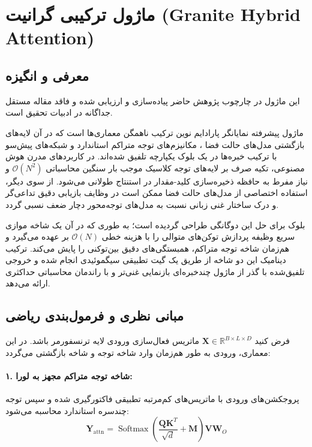 \section{ماژول ترکیبی گرانیت (Granite Hybrid Attention)}
\label{sec:module_granite_hybrid}

\subsection{معرفی و انگیزه}
این ماژول در چارچوب پژوهش حاضر پیاده‌سازی و ارزیابی شده و فاقد مقاله مستقل جداگانه در ادبیات تحقیق است.

ماژول پیشرفته  نمایانگر پارادایم نوین ترکیب ناهمگن معماری‌ها  است که در آن لایه‌های بازگشتی مدل‌های حالت فضا ، مکانیزم‌های توجه متراکم استاندارد  و شبکه‌های پیش‌سو با ترکیب خبره‌ها  در یک بلوک یکپارچه تلفیق شده‌اند. در کاربردهای مدرن هوش مصنوعی، تکیه صرف بر لایه‌های توجه کلاسیک موجب بار سنگین محاسباتی $\mathcal{O}(N^2)$ و نیاز مفرط به حافظه ذخیره‌سازی کلید-مقدار  در استنتاج طولانی می‌شود. از سوی دیگر، استفاده اختصاصی از مدل‌های حالت فضا ممکن است در وظایف بازیابی دقیق تداعی‌گر  و درک ساختار غنی زبانی نسبت به مدل‌های توجه‌محور دچار ضعف نسبی گردد.

بلوک  برای حل این دوگانگی طراحی گردیده است؛ به طوری که در آن یک شاخه موازی سریع  وظیفه پردازش توکن‌های متوالی را با هزینه خطی $\mathcal{O}(N)$ بر عهده می‌گیرد و هم‌زمان شاخه توجه متراکم، همبستگی‌های دقیق بین‌توکنی را پایش می‌کند. ترکیب دینامیک این دو شاخه از طریق یک گیت تطبیقی سیگموئیدی انجام شده و خروجی تلفیق‌شده با گذر از ماژول چندخبره‌ای  بازنمایی غنی‌تر و با راندمان محاسباتی حداکثری ارائه می‌دهد.

\subsection{مبانی نظری و فرمول‌بندی ریاضی}
فرض کنید $\mathbf{X} \in \mathbb{R}^{B \times L \times D}$ ماتریس فعال‌سازی ورودی لایه ترنسفورمر باشد. در این معماری، ورودی به طور هم‌زمان وارد شاخه توجه و شاخه بازگشتی  می‌گردد:

\paragraph{۱. شاخه توجه متراکم مجهز به لورا:}
پروجکشن‌های ورودی با ماتریس‌های کم‌مرتبه تطبیقی فاکتورگیری شده و سپس توجه چندسره استاندارد محاسبه می‌شود:
\begin{equation}
\mathbf{Y}_{\text{attn}} = \operatorname{Softmax}\left(\frac{\mathbf{Q} \mathbf{K}^T}{\sqrt{d}} + \mathbf{M}\right) \mathbf{V} \mathbf{W}_O
\end{equation}

